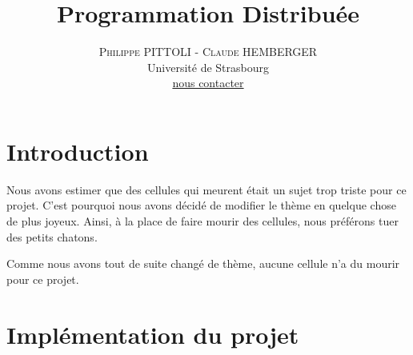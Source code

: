\documentclass[twoside]{article}
\title{\vspace{-15mm}\fontsize{24pt}{10pt}\selectfont\textbf{Programmation Distribuée}}
\author{
\large
\textsc{Philippe PITTOLI - Claude HEMBERGER}\\[2mm]
\normalsize Université de Strasbourg \\ 
\normalsize \href{mailto:philippe.pittoli@etu.unistra.fr}{nous contacter}
\vspace{-5mm}
}
\date{}
\begin{document}
\maketitle %

\thispagestyle{fancy} %



\section{Introduction}
Nous avons estimer que des cellules qui meurent était un sujet trop triste pour ce projet.
C'est pourquoi nous avons décidé de modifier le thème en quelque chose de plus joyeux.
Ainsi, à la place de faire mourir des cellules, nous préférons tuer des petits chatons.

Comme nous avons tout de suite changé de thème, aucune cellule n'a du mourir pour ce projet.

\section{Implémentation du projet}
\end{document}
